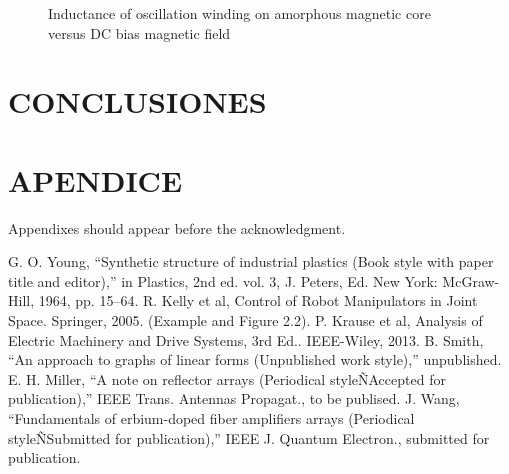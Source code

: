 \documentclass[a4paper, 10pt, onecolumn,journal]{ieeeconf}
\begin{document}
   \begin{figure}[thpb]
      \centering
      \caption{Inductance of oscillation winding on amorphous
       magnetic core versus DC bias magnetic field}
      \label{figurelabel}
   \end{figure}

\section{CONCLUSIONES}


\addtolength{\textheight}{-12cm}   %







\section*{APENDICE}

Appendixes should appear before the acknowledgment.

\begin{thebibliography}{99}

 G. O. Young, ``Synthetic structure of industrial plastics (Book style with paper title and editor),'' 	in Plastics, 2nd ed. vol. 3, J. Peters, Ed.  New York: McGraw-Hill, 1964, pp. 15--64.
 R. Kelly et al, Control of Robot Manipulators in Joint Space. Springer, 2005. (Example and Figure 2.2).
 P. Krause et al, Analysis of Electric Machinery and Drive Systems, 3rd Ed.. IEEE-Wiley, 2013.
 B. Smith, ``An approach to graphs of linear forms (Unpublished work style),'' unpublished.
 E. H. Miller, ``A note on reflector arrays (Periodical styleÑAccepted for publication),'' IEEE Trans. Antennas Propagat., to be publised.
 J. Wang, ``Fundamentals of erbium-doped fiber amplifiers arrays (Periodical styleÑSubmitted for publication),'' IEEE J. Quantum Electron., submitted for publication.

\end{thebibliography}
\end{document}
